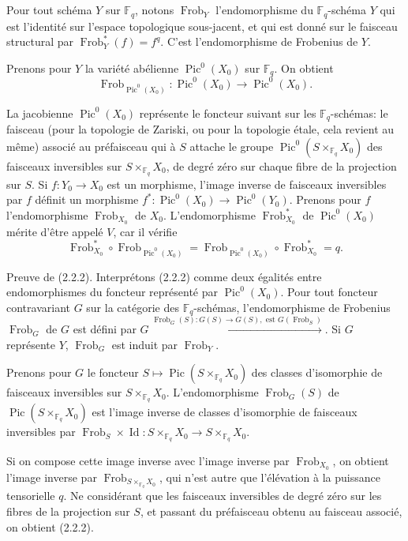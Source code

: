\documentclass[11pt,a4paper]{article}
\theoremstyle{plain}
\theoremstyle{definition}
\DeclareMathOperator{\Pic}{Pic}
\DeclareMathOperator{\Frob}{Frob}
\DeclareMathOperator{\Id}{Id}
\newcommand{\F}{\mathbb{F}}
\begin{document}
\subsection{}
Pour tout sch\'ema $Y$ sur $\F_q$, notons $\Frob_Y$ l'endomorphisme du $\F_q$-sch\'ema $Y$ qui est l'identit\'e sur l'espace topologique sous-jacent, et qui est donn\'e sur le faisceau structural par $\Frob_Y^*(f) = f^q$. C'est l'endomorphisme de Frobenius de $Y$.

Prenons pour $Y$ la vari\'et\'e ab\'elienne $\Pic^0(X_0)$ sur $\F_q$. On obtient
\begin{equation}
\Frob_{\Pic^0(X_0)}: \Pic^0(X_0) \longrightarrow \Pic^0(X_0).
\tag{2.2.1}
\end{equation}

La jacobienne $\Pic^0(X_0)$ repr\'esente le foncteur suivant sur les $\F_q$-sch\'emas: le faisceau (pour la topologie de Zariski, ou pour la topologie \'etale, cela revient au m\^eme) associ\'e au pr\'efaisceau qui \`a $S$ attache le groupe $\Pic^0(S \times_{\F_q} X_0)$ des faisceaux inversibles sur $S \times_{\F_q} X_0$, de degr\'e z\'ero sur chaque fibre de la projection sur $S$. Si $f: Y_0 \to X_0$ est un morphisme, l'image inverse de faisceaux inversibles par $f$ d\'efinit un morphisme $f^*: \Pic^0(X_0) \to \Pic^0(Y_0)$. Prenons pour $f$ l'endomorphisme $\Frob_{X_0}$ de $X_0$. L'endomorphisme $\Frob_{X_0}^*$ de $\Pic^0(X_0)$ m\'erite d'\^etre appel\'e $V$, car il v\'erifie
\begin{equation}
\Frob_{X_0}^* \circ \Frob_{\Pic^0(X_0)} = \Frob_{\Pic^0(X_0)} \circ \Frob_{X_0}^* = q.
\tag{2.2.2}
\end{equation}

Preuve de (2.2.2). Interpr\'etons (2.2.2) comme deux \'egalit\'es entre endomorphismes du foncteur repr\'esent\'e par $\Pic^0(X_0)$. Pour tout foncteur contravariant $G$ sur la cat\'egorie des $\F_q$-sch\'emas, l'endomorphisme de Frobenius $\Frob_G$ de $G$ est d\'efini par $G \xrightarrow{\Frob_G(S): G(S) \to G(S),\text{ est } G(\Frob_S)}$. Si $G$ repr\'esente $Y$, $\Frob_G$ est induit par $\Frob_Y$.

Prenons pour $G$ le foncteur $S \mapsto \Pic(S \times_{\F_q} X_0)$ des classes d'isomorphie de faisceaux inversibles sur $S \times_{\F_q} X_0$. L'endomorphisme $\Frob_G(S)$ de $\Pic(S \times_{\F_q} X_0)$ est l'image inverse de classes d'isomorphie de faisceaux inversibles par $\Frob_S \times \Id: S \times_{\F_q} X_0 \to S \times_{\F_q} X_0$.

Si on compose cette image inverse avec l'image inverse par $\Frob_{X_0}$, on obtient l'image inverse par $\Frob_{S \times_{\F_q} X_0}$, qui n'est autre que l'\'el\'evation \`a la puissance tensorielle $q$. Ne consid\'erant que les faisceaux inversibles de degr\'e z\'ero sur les fibres de la projection sur $S$, et passant du pr\'efaisceau obtenu au faisceau associ\'e, on obtient (2.2.2).
\end{document}
